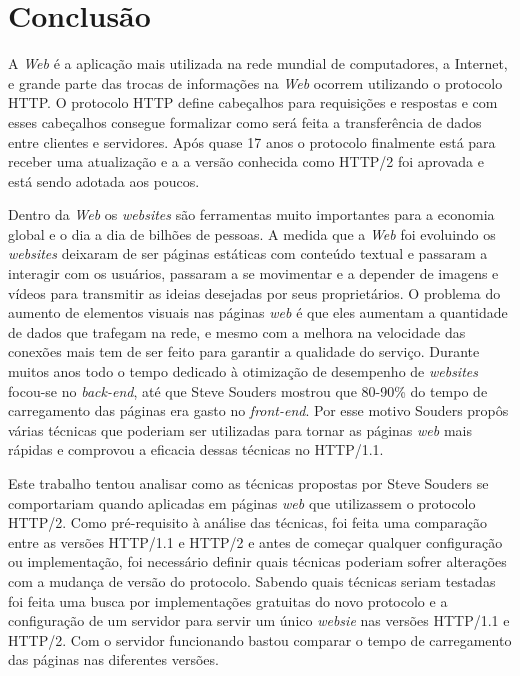%
%

\chapter{Conclusão}

A \textit{Web} é a aplicação mais utilizada na rede mundial de computadores, a Internet, e grande parte das trocas de informações na \textit{Web} ocorrem utilizando o protocolo HTTP. O protocolo HTTP define cabeçalhos para requisições e respostas e com esses cabeçalhos consegue formalizar como será feita a transferência de dados entre clientes e servidores. Após quase 17 anos o protocolo finalmente está para receber uma atualização e a a versão conhecida como HTTP/2 foi aprovada e está sendo adotada aos poucos.

Dentro da \textit{Web} os \textit{websites} são ferramentas muito importantes para a economia global e o dia a dia de bilhões de pessoas. A medida que a \textit{Web} foi evoluindo os \textit{websites} deixaram de ser páginas estáticas com conteúdo textual e passaram a interagir com os usuários, passaram a se movimentar e a depender de imagens e vídeos para transmitir as ideias desejadas por seus proprietários. O problema do aumento de elementos visuais nas páginas \textit{web} é que eles aumentam a quantidade de dados que trafegam na rede, e mesmo com a melhora na velocidade das conexões mais tem de ser feito para garantir a qualidade do serviço. Durante muitos anos todo o tempo dedicado à otimização de desempenho de \textit{websites} focou-se no \textit{back-end}, até que Steve Souders mostrou que 80-90\% do tempo de carregamento das páginas era gasto no \textit{front-end}. Por esse motivo Souders propôs várias técnicas que poderiam ser utilizadas para tornar as páginas \textit{web} mais rápidas e comprovou a eficacia dessas técnicas no HTTP/1.1.

Este trabalho tentou analisar como as técnicas propostas por Steve Souders se comportariam quando aplicadas em páginas \textit{web} que utilizassem o protocolo HTTP/2. Como pré-requisito à análise das técnicas, foi feita uma comparação entre as versões HTTP/1.1 e HTTP/2 e antes de começar qualquer configuração ou implementação, foi necessário definir quais técnicas poderiam sofrer alterações com a mudança de versão do protocolo. Sabendo quais técnicas seriam testadas foi feita uma busca por implementações gratuitas do novo protocolo e a configuração de um servidor para servir um único \textit{websie} nas versões HTTP/1.1 e HTTP/2. Com o servidor funcionando bastou comparar o tempo de carregamento das páginas nas diferentes versões.

